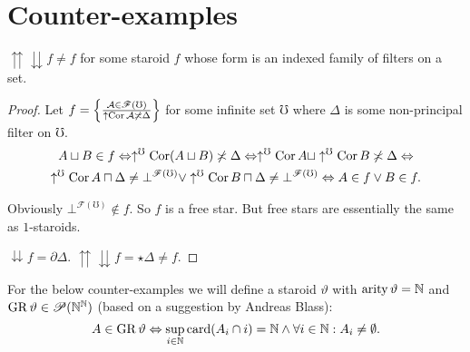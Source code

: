 \section{Counter-examples}
\begin{example}
$\upuparrows\downdownarrows f\neq f$ for some staroid $f$ whose
form is an indexed family of filters on a set.\end{example}
\begin{proof}
Let $f=\left\{ \frac{\mathcal{A}\in\mathscr{F}(\mho)}{\uparrow\operatorname{Cor}\mathcal{A}\not\asymp\Delta}\right\}$
for some infinite set $\mho$ where $\Delta$ is some non-principal
filter on $\mho$.
\begin{multline*}
A\sqcup B\in f\Leftrightarrow\uparrow^{\mho}\operatorname{Cor}(A\sqcup B)\not\asymp\Delta\Leftrightarrow\uparrow^{\mho}\operatorname{Cor} A\sqcup\uparrow^{\mho}\operatorname{Cor} B\not\asymp\Delta\Leftrightarrow\\
\uparrow^{\mho}\operatorname{Cor} A\sqcap\Delta\neq\bot^{\mathscr{F}(\mho)}\vee\uparrow^{\mho}\operatorname{Cor} B\sqcap\Delta\neq\bot^{\mathscr{F}(\mho)}\Leftrightarrow A\in f\vee B\in f.
\end{multline*}


Obviously $\bot^{\mathscr{F}(\mho)}\notin f$. So $f$ is a free star.
But free stars are essentially the same as $1$-staroids.

$\downdownarrows f=\partial\Delta$. $\upuparrows\downdownarrows f=\star\Delta\neq f$.
\end{proof}
For the below counter-examples we will define a staroid $\vartheta$
with $\operatorname{arity}\vartheta=\mathbb{N}$ and $\operatorname{GR}\vartheta\in\mathscr{P}(\mathbb{N}^{\mathbb{N}})$
(based on a suggestion by Andreas Blass): 
\[
A\in\operatorname{GR}\vartheta\Leftrightarrow\sup_{i\in\mathbb{N}}\operatorname{card}(A_{i}\cap i)=\mathbb{N}\wedge\forall i\in\mathbb{N}:A_{i}\neq\emptyset.
\]

